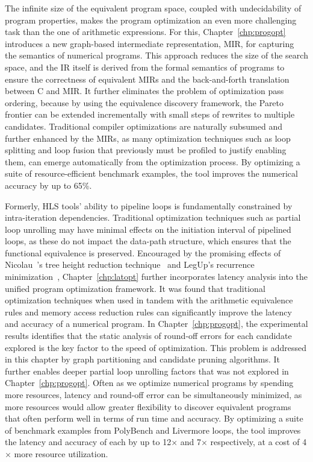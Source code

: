 The infinite size of the equivalent program space, coupled with undecidability
of program properties, makes the program optimization an even more
challenging task than the one of arithmetic expressions.  For this,
Chapter~\ref{chp:progopt} introduces a new graph-based intermediate
representation, MIR, for capturing the semantics of numerical programs.  This
approach reduces the size of the search space, and the IR itself is derived
from the formal semantics of programs to ensure the correctness of equivalent
MIRs and the back-and-forth translation between C and MIR\@.  It further
eliminates the problem of optimization pass ordering, because by using
the equivalence discovery framework, the Pareto frontier can be extended
incrementally with small steps of rewrites to multiple candidates.  Traditional
compiler optimizations are naturally subsumed and further enhanced by the MIRs,
as many optimization techniques such as loop splitting and loop fusion that
previously must be profiled to justify enabling them, can emerge automatically
from the optimization process.  By optimizing a suite of resource-efficient
benchmark examples, the tool improves the numerical accuracy by up to 65\%.

Formerly, HLS tools' ability to pipeline loops is fundamentally constrained
by intra-iteration dependencies.  Traditional optimization techniques such as
partial loop unrolling may have minimal effects on the initiation interval of
pipelined loops, as these do not impact the data-path structure, which ensures
that the functional equivalence is preserved.  Encouraged by the promising
effects of Nicolau~\etal's tree height reduction technique~\cite{nicolau91}
and LegUp's recurrence minimization~\cite{canis14}, Chapter~\ref{chp:latopt}
further incorporates latency analysis into the unified program optimization
framework.  It was found that traditional optimization techniques when used
in tandem with the arithmetic equivalence rules and memory access reduction
rules can significantly improve the latency and accuracy of a numerical
program.  In Chapter~\ref{chp:progopt}, the experimental results identifies
that the static analysis of round-off errors for each candidate explored is
the key factor to the speed of optimization.  This problem is addressed in
this chapter by graph partitioning and candidate pruning algorithms.  It
further enables deeper partial loop unrolling factors that was not explored in
Chapter~\ref{chp:progopt}.  Often as we optimize numerical programs by spending
more resources, latency and round-off error can be simultaneously minimized, as
more resources would allow greater flexibility to discover equivalent programs
that often perform well in terms of run time and accuracy.  By optimizing
a suite of benchmark examples from PolyBench and Livermore loops, the tool
improves the latency and accuracy of each by up to 12$\times$ and 7$\times$
respectively, at a cost of 4$\times$ more resource utilization.


